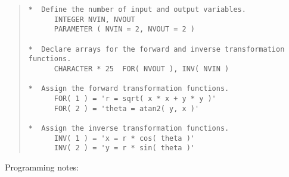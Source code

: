 \begin{quote}
\begin{tabbing} %

\verb#*  Define the number of input and output variables.    #\\
\verb#      INTEGER NVIN, NVOUT                              #\\
\verb#      PARAMETER ( NVIN = 2, NVOUT = 2 )                #\\
\verb#                                                       #\\
\verb#*  Declare arrays for the forward and inverse transformation functions.#\\
\verb#      CHARACTER * 25  FOR( NVOUT ), INV( NVIN )        #\\
\verb#                                                       #\\
\verb#*  Assign the forward transformation functions.        #\\
\verb#      FOR( 1 ) = 'r = sqrt( x * x + y * y )'           #\\
\verb#      FOR( 2 ) = 'theta = atan2( y, x )'               #\\
\verb#                                                       #\\
\verb#*  Assign the inverse transformation functions.        #\\
\verb#      INV( 1 ) = 'x = r * cos( theta )'                #\\
\verb#      INV( 2 ) = 'y = r * sin( theta )'                #

\end{tabbing}
\end{quote}

Programming notes:

